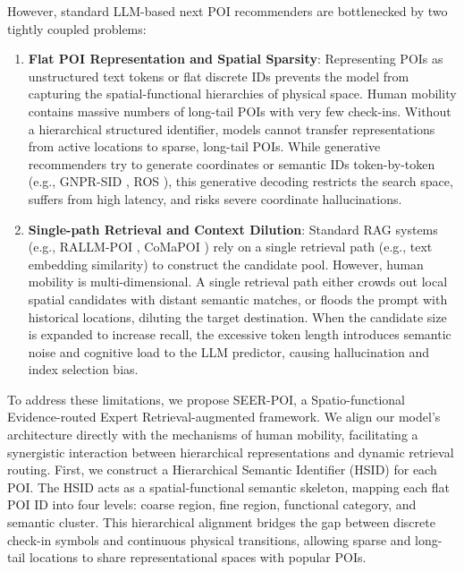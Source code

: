\documentclass[10pt,twocolumn]{article}
\newcommand{\method}{SEER-POI}
\newcommand{\hsid}{HSID}
\begin{document}
However, standard LLM-based next POI recommenders are bottlenecked by two tightly coupled problems:
\begin{enumerate}
    \item \textbf{Flat POI Representation and Spatial Sparsity}: Representing POIs as unstructured text tokens or flat discrete IDs prevents the model from capturing the spatial-functional hierarchies of physical space. Human mobility contains massive numbers of long-tail POIs with very few check-ins. Without a hierarchical structured identifier, models cannot transfer representations from active locations to sparse, long-tail POIs. While generative recommenders try to generate coordinates or semantic IDs token-by-token (e.g., GNPR-SID \cite{gnprsid}, ROS \cite{ros}), this generative decoding restricts the search space, suffers from high latency, and risks severe coordinate hallucinations.
    \item \textbf{Single-path Retrieval and Context Dilution}: Standard RAG systems (e.g., RALLM-POI \cite{rallmpoi}, CoMaPOI \cite{comapoi}) rely on a single retrieval path (e.g., text embedding similarity) to construct the candidate pool. However, human mobility is multi-dimensional. A single retrieval path either crowds out local spatial candidates with distant semantic matches, or floods the prompt with historical locations, diluting the target destination. When the candidate size is expanded to increase recall, the excessive token length introduces semantic noise and cognitive load to the LLM predictor, causing hallucination and index selection bias.
\end{enumerate}

To address these limitations, we propose \method, a Spatio-functional Evidence-routed Expert Retrieval-augmented framework. We align our model's architecture directly with the mechanisms of human mobility, facilitating a synergistic interaction between hierarchical representations and dynamic retrieval routing. First, we construct a Hierarchical Semantic Identifier (\hsid) for each POI. The \hsid{} acts as a spatial-functional semantic skeleton, mapping each flat POI ID into four levels: coarse region, fine region, functional category, and semantic cluster. This hierarchical alignment bridges the gap between discrete check-in symbols and continuous physical transitions, allowing sparse and long-tail locations to share representational spaces with popular POIs.
\end{document}
